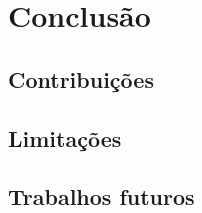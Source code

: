\chapter{Conclusão}
\label{cap:conclusao}


\section{Contribuições}
\pendente{}

\section{Limitações}
\pendente{}

\section{Trabalhos futuros}
\pendente{}
